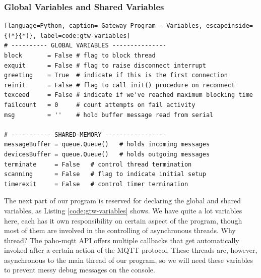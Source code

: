 \subsubsection{Global Variables and Shared Variables}
\begin{lstlisting}[language=Python, caption= Gateway Program - Variables, escapeinside={(*}{*)}, label=code:gtw-variables]
# ---------- GLOBAL VARIABLES ---------------
block       = False # flag to block thread
exquit      = False # flag to raise disconnect interrupt
greeting    = True  # indicate if this is the first connection
reinit      = False # flag to call init() procedure on reconnect
texceed     = False # indicate if we've reached maximum blocking time
failcount   = 0     # count attempts on fail activity
msg         = ''    # hold buffer message read from serial

# ----------- SHARED-MEMORY -----------------
messageBuffer = queue.Queue()   # holds incoming messages
devicesBuffer = queue.Queue()   # holds outgoing messages
terminate     = False   # control thread termination
scanning      = False   # flag to indicate initial setup
timerexit     = False   # control timer termination
\end{lstlisting}
The next part of our program is reserved for declaring the global and shared variables, as Listing \ref{code:gtw-variables} shows. We have quite a lot variables here, each has it own responsibility on certain aspect of the program, though most of them are involved in the controlling of asynchronous threads. Why thread? The paho-mqtt API offers multiple callbacks that get automatically invoked after a certain action of the MQTT protocol. These threads are, however, asynchronous to the main thread of our program, so we will need these variables to prevent messy debug messages on the console.

